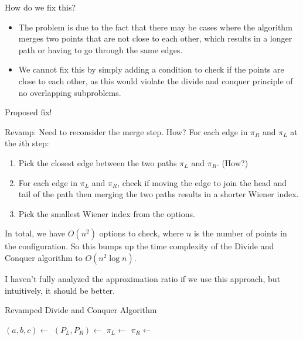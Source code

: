 \documentclass[11pt]{beamer}
\begin{document}
\begin{frame}{How do we fix this?}
	\begin{itemize}
		\item The problem is due to the fact that there may be cases where the algorithm merges two points that are not close to each other, which results in a longer path or having to go through the same edges.
		      \pause
		      \vspace{0.5cm}
		\item We cannot fix this by simply adding a condition to check if the points are close to each other, as this would violate the divide and conquer principle of no overlapping subproblems.
	\end{itemize}
\end{frame}

\begin{frame}{Proposed fix!}
	\begin{block}{Revamp: Need to reconsider the merge step. How?}
		For each edge in $\pi_R$ and $\pi_L$ at the $i$th step:
		\begin{enumerate}
			\item Pick the closest edge between the two paths $\pi_L$ and $\pi_R$. (How?)
			      \pause
			\item For each edge in $\pi_L$ and $\pi_R$, check if moving the edge to join the head and tail of the path then merging the two paths results in a shorter Wiener index.
			      \pause
			\item Pick the smallest Wiener index from the options.
		\end{enumerate}
	\end{block}
	\pause
	In total, we have $O(n^2)$ options to check, where $n$ is the number of points in the configuration. So this bumps up the time complexity of the Divide and Conquer algorithm to $O(n^2 \log n)$.

	\pause
	I haven't fully analyzed the approximation ratio if we use this approach, but intuitively, it should be better.
\end{frame}

\begin{frame}{Revamped Divide and Conquer Algorithm}
	\begin{algorithm}[H]
		\caption{DivideAndConquerWienerRevamped($P$)}
		\begin{algorithmic}[1]
			\State \Return {}
			\EndIf
			\State $(a, b, c) \gets$ 
			\State $(P_L, P_R) \gets$ 
			\State $\pi_L \gets$ 
			\State $\pi_R \gets$ 
			\State \Return {}
			\EndProcedure
		\end{algorithmic}
	\end{algorithm}
\end{frame}
\end{document}
